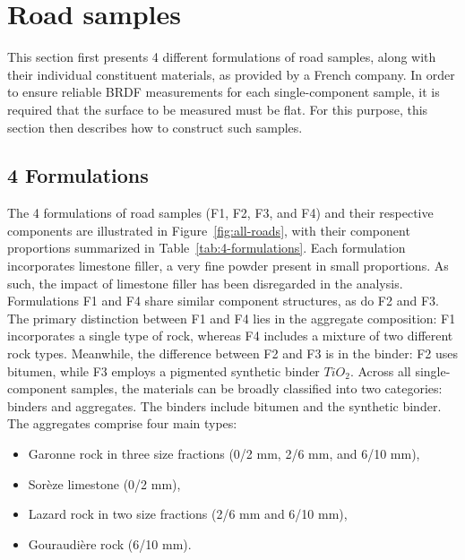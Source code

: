 \section{Road samples}

This section first presents 4 different formulations of road samples, along with their individual constituent materials, as provided by a French company.
In order to ensure reliable BRDF measurements for each single-component sample, it is required that the surface to be measured must be flat.
For this purpose, this section then describes how to construct such samples.


\subsection{4 Formulations}

The 4 formulations of road samples (F1, F2, F3, and F4) and their respective components are illustrated in Figure~\ref{fig:all-roads}, with their component proportions summarized in Table~\ref{tab:4-formulations}.
Each formulation incorporates limestone filler, a very fine powder present in small proportions. 
As such, the impact of limestone filler has been disregarded in the analysis.
Formulations F1 and F4 share similar component structures, as do F2 and F3.
The primary distinction between F1 and F4 lies in the aggregate composition: F1 incorporates a single type of rock, whereas F4 includes a mixture of two different rock types.
Meanwhile, the difference between F2 and F3 is in the binder: F2 uses bitumen, while F3 employs a pigmented synthetic binder $TiO_2$.
Across all single-component samples, the materials can be broadly classified into two categories: binders and aggregates.
The binders include bitumen and the synthetic binder.
The aggregates comprise four main types:
\begin{itemize}
    \item Garonne rock in three size fractions (0/2 mm, 2/6 mm, and 6/10 mm),
    \item Sorèze limestone (0/2 mm),
    \item Lazard rock in two size fractions (2/6 mm and 6/10 mm),
    \item Gouraudière rock (6/10 mm).
\end{itemize}


